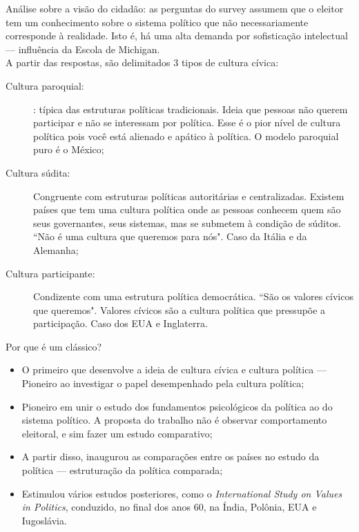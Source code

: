 \noindent Análise sobre a visão do cidadão: as perguntas do survey assumem que o eleitor tem um conhecimento sobre o sistema político que não necessariamente corresponde à realidade. Isto é, há uma alta demanda por sofisticação intelectual --- influência da Escola de Michigan. \\

\noindent A partir das respostas, são delimitados 3 tipos de cultura cívica:

\begin{description}
    \item [Cultura paroquial:] : típica das estruturas políticas tradicionais. Ideia que pessoas não querem participar e não se interessam por política. Esse é o pior nível de cultura política pois você está alienado e apático à política. O modelo paroquial puro é o México;
    \item [Cultura súdita:] Congruente com estruturas políticas autoritárias e centralizadas. Existem países que tem uma cultura política onde as pessoas conhecem quem são seus governantes, seus sistemas, mas se submetem à condição de súditos. ``Não é uma cultura que queremos para nós". Caso da Itália e da Alemanha;
    \item [Cultura participante:] Condizente com uma estrutura política democrática. ``São os valores cívicos que queremos". Valores cívicos são a cultura política que pressupõe a participação. Caso dos EUA e Inglaterra. \\
\end{description}

\noindent Por que é um clássico? 

\begin{itemize}
    \item O primeiro que desenvolve a ideia de cultura cívica e cultura política --- Pioneiro ao investigar o papel desempenhado pela cultura política;
    \item Pioneiro em unir o estudo dos fundamentos psicológicos da política ao do sistema político. A proposta do trabalho não é observar comportamento eleitoral, e sim fazer um estudo comparativo;
    \item A partir disso, inaugurou as comparações entre os países no estudo da política --- estruturação da política comparada;
    \item Estimulou vários estudos posteriores, como o \textit{International Study on Values in Politics}, conduzido, no final dos anos 60, na Índia, Polônia, EUA e Iugoslávia. \\
\end{itemize}

